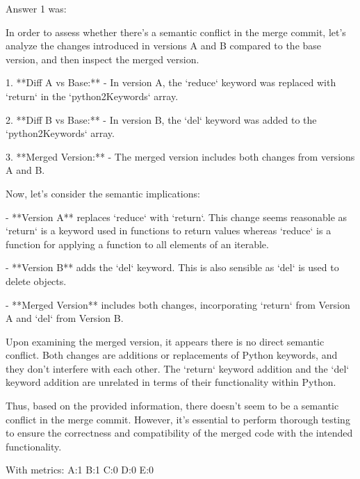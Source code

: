 Answer 1 was:
\begin{spverbatim}
In order to assess whether there's a semantic conflict in the merge commit, let's analyze the changes introduced in versions A and B compared to the base version, and then inspect the merged version.

1. **Diff A vs Base:**
   - In version A, the `reduce` keyword was replaced with `return` in the `python2Keywords` array.

2. **Diff B vs Base:**
   - In version B, the `del` keyword was added to the `python2Keywords` array.

3. **Merged Version:**
   - The merged version includes both changes from versions A and B.

Now, let's consider the semantic implications:

- **Version A** replaces `reduce` with `return`. This change seems reasonable as `return` is a keyword used in functions to return values whereas `reduce` is a function for applying a function to all elements of an iterable.
  
- **Version B** adds the `del` keyword. This is also sensible as `del` is used to delete objects.

- **Merged Version** includes both changes, incorporating `return` from Version A and `del` from Version B.

Upon examining the merged version, it appears there is no direct semantic conflict. Both changes are additions or replacements of Python keywords, and they don't interfere with each other. The `return` keyword addition and the `del` keyword addition are unrelated in terms of their functionality within Python.

Thus, based on the provided information, there doesn't seem to be a semantic conflict in the merge commit. However, it's essential to perform thorough testing to ensure the correctness and compatibility of the merged code with the intended functionality.
\end{spverbatim}

With metrics:
A:1
B:1
C:0
D:0
E:0

